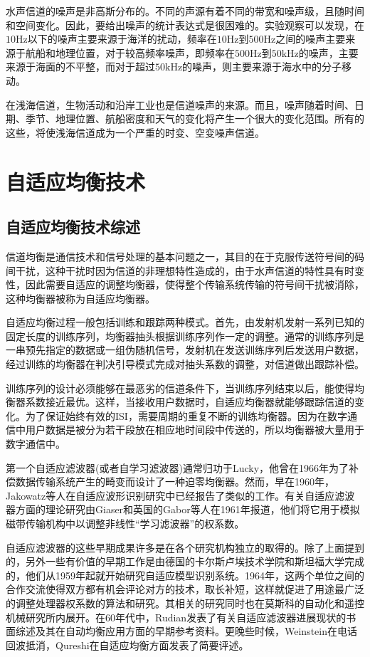 水声信道的噪声是非高斯分布的。不同的声源有着不同的带宽和噪声级，且随时间和空间变化。因此，要给出噪声的统计表达式是很困难的。实验观察可以发现，在$10\mbox{Hz}$以下的噪声主要来源于海洋的扰动，频率在$10\mbox{Hz}$到$500\mbox{Hz}$之间的噪声主要来源于航船和地理位置，对于较高频率噪声，即频率在$500\mbox{Hz}$到$50\mbox{kHz}$的噪声，主要来源于海面的不平整，而对于超过$50\mbox{kHz}$的噪声，则主要来源于海水中的分子移动。

在浅海信道，生物活动和沿岸工业也是信道噪声的来源。而且，噪声随着时间、日期、季节、地理位置、航船密度和天气的变化将产生一个很大的变化范围。所有的这些，将使浅海信道成为一个严重的时变、空变噪声信道。
\section{自适应均衡技术}
\subsection{自适应均衡技术综述}
信道均衡是通信技术和信号处理的基本问题之一，其目的在于克服传送符号间的码间干扰，这种干扰时因为信道的非理想特性造成的，由于水声信道的特性具有时变性，因此需要自适应的调整均衡器，使得整个传输系统传输的符号间干扰被消除，这种均衡器被称为自适应均衡器。

自适应均衡过程一般包括训练和跟踪两种模式。首先，由发射机发射一系列已知的固定长度的训练序列，均衡器抽头根据训练序列作一定的调整。通常的训练序列是一串预先指定的数据或一组伪随机信号，发射机在发送训练序列后发送用户数据，经过训练的均衡器在判决引导模式完成对抽头系数的调整，对信道做出跟踪补偿。

训练序列的设计必须能够在最恶劣的信道条件下，当训练序列结束以后，能使得均衡器系数接近最优。这样，当接收用户数据时，自适应均衡器就能够跟踪信道的变化。为了保证始终有效的ISI，需要周期的重复不断的训练均衡器。因为在数字通信中用户数据是被分为若干段放在相应地时间段中传送的，所以均衡器被大量用于数字通信中。

第一个自适应滤波器(或者自学习滤波器)通常归功于Lucky，他曾在1966年为了补偿数据传输系统产生的畸变而设计了一种迫零均衡器。然而，早在1960年，Jakowatz等人在自适应波形识别研究中已经报告了类似的工作。有关自适应滤波器方面的理论研究由Giaser和英国的Gabor等人在1961年报道，他们将它用于模拟磁带传输机构中以调整非线性“学习滤波器”的权系数。

自适应滤波器的这些早期成果许多是在各个研究机构独立的取得的。除了上面提到的，另外一些有价值的早期工作是由德国的卡尔斯卢埃技术学院和斯坦福大学完成的，他们从1959年起就开始研究自适应模型识别系统。1964年，这两个单位之间的合作交流使得双方都有机会评论对方的技术，取长补短，这样就促进了用途最广泛的调整处理器权系数的算法和研究。其相关的研究同时也在莫斯科的自动化和遥控机械研究所内展开。在60年代中，Rudian发表了有关自适应滤波器进展现状的书面综述及其在自动均衡应用方面的早期参考资料。更晚些时候，Weinstein在电话回波抵消，Qureshi在自适应均衡方面发表了简要评述。

